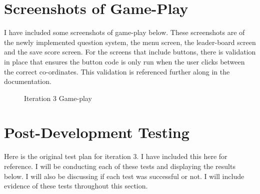 \documentclass[12pt]{report}
\begin{document}
\pagebreak

\section{Screenshots of Game-Play}
I have included some screenshots of game-play below. These screenshots are of the newly implemented question system, the menu screen, the leader-board screen and the save score screen. For the screens that include buttons, there is validation in place that ensures the button code is only run when the user clicks between the correct co-ordinates. This validation is referenced further along in the documentation.

 \begin{figure}[H]
    \begin{center}
    \end{center}
    \caption{Iteration 3 Game-play}
\end{figure}

\pagebreak

\section{Post-Development Testing}
Here is the original test plan for iteration 3. I have included this here for reference. I will be conducting each of these tests and displaying the results below. I will also be discussing if each test was successful or not. I will include evidence of these tests throughout this section. 
\end{document}
